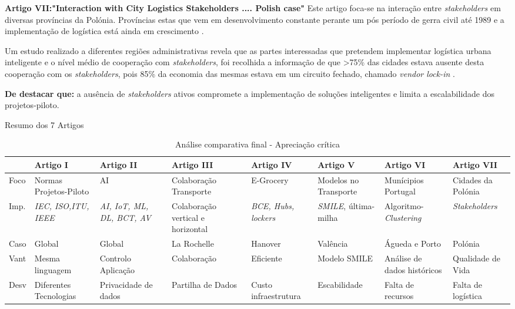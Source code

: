 \documentclass[
aspectratio=169,	%
MEEC,				%
portuguese,			%
]{DEEclassP}
\begin{document}
\begin{frame}{\textbf{Artigo VII:"Interaction with City Logistics Stakeholders .... Polish case"\cite{en15114103}}}
Este artigo foca-se na interação entre \textit{stakeholders} em diversas províncias da Polónia.
Províncias estas que vem em desenvolvimento constante perante um pós período de gerra civil até 1989 e a implementação de logística está ainda em crescimento \cite{en15114103}.

Um estudo realizado a diferentes regiões administrativas revela que as partes interessadas que pretendem implementar logística urbana inteligente e o nível médio de cooperação com \textit{stakeholders}, foi recolhida a informação de que >75\% das cidades estava ausente desta cooperação com os \textit{stakeholders}, pois 85\% da economia das mesmas estava em um circuito fechado, chamado \textit{vendor lock-in} \cite{en15114103}.

\textbf{De destacar que:} a ausência de \textit{stakeholders} ativos compromete a implementação de soluções inteligentes e limita a escalabilidade dos projetos-piloto.
\end{frame}
\begin{frame}{Resumo dos 7 Artigos}

\begin{table}[H]
\centering
\footnotesize
\begin{tabular}{|p{0.45cm}|p{1.7cm}|p{1.45cm}|p{1.6cm}|p{1.6cm}|p{1.6cm}|p{1.6cm}|p{1.9cm}|}
\hline
 & \textbf{Artigo I} & \textbf{Artigo II} & \textbf{Artigo III} & \textbf{Artigo IV} & \textbf{Artigo V} & \textbf{Artigo VI} & \textbf{Artigo VII} \\
\hline
Foco & Normas Projetos-Piloto & AI & Colaboração Transporte & E-Grocery & Modelos no Transporte & Munícipios Portugal & Cidades da Polónia \\
\hline
Imp. & \textit{IEC, ISO,ITU, IEEE} & \textit{AI, IoT, ML, DL, BCT, AV} & Colaboração vertical e horizontal  & \textit{BCE, Hubs, lockers} & \textit{SMILE}, última-milha & Algoritmo-\textit{Clustering}  & \textit{Stakeholders} \\
\hline
Caso & Global & Global & La Rochelle & Hanover & Valência & Águeda e Porto & Polónia \\
\hline
Vant & Mesma linguagem & Controlo Aplicação & Colaboração & Eficiente & Modelo SMILE & Análise de dados históricos & Qualidade de Vida \\
\hline
Desv & Diferentes Tecnologias & Privacidade de dados & Partilha de Dados & Custo infraestrutura & Escabilidade & Falta de recursos & Falta de logística \\
\hline
\end{tabular}
\caption{Análise comparativa final - Apreciação crítica}
\end{table}
\end{frame}
\end{document}
